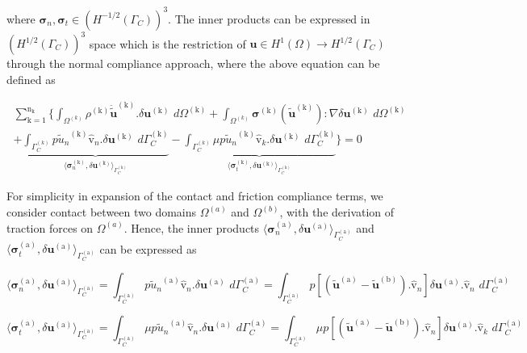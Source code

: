 where $\bm \sigma_n, \bm \sigma_t \in (H^{-1/2}(\Gamma_C))^3$.  The inner products can be expressed in $(H^{1/2}(\Gamma_C))^{3}$ space which is the restriction of $\bm u \in H^{1}(\Omega) \rightarrow H^{1/2} (\Gamma_C)$  through the normal compliance approach, where the above equation can be defined as  

\begin{multline}  
\sum_{\mathrm{k}=1}^{\mathrm{n}_{\mathrm{\mathrm{k}}}}   \bigg\{  \int_{\Omega^{(k)}}\rho^\mathrm{(k)}\bm{\ddot{\widetilde{u}}}^\mathrm{(k)}. \delta\bm u^\mathrm{(k)} \,\,d\Omega^\mathrm{(k)}+\int_{\Omega^{(k)}} \bm{\sigma}^\mathrm{(k)}(\bm{\widetilde u}^\mathrm{(k)}) : \nabla \delta\bm u^\mathrm{(k)} \,\,d\Omega^\mathrm{(k)}\\  
+ \underbrace{\int_{\Gamma^{(k)}_C}  \mathit{p}{\widetilde{u}_n}^{(\mathrm k)} \bm{\hat{\mathrm v}}_n. \delta\bm u^\mathrm{(k)}  \,\,d\Gamma_{C}^\mathrm{(k)}}_{\langle \bm{\sigma}^{\mathrm{(k)}}_n, \delta \bm u^{\mathrm{(k)}} \rangle_{\Gamma_C^{\mathrm{(k)}}}} 
- \underbrace{\int_{\Gamma^{(k)}_C} \mu \mathit{p}{\widetilde{u}_n}^{(\mathrm k)} \bm{\hat{\mathrm v}}_k. \delta\bm u^\mathrm{(k)}  \,\,d\Gamma_{C}^\mathrm{(k)}}_{\langle \bm{\sigma}^{\mathrm{(k)}}_t, \delta \bm u^{\mathrm{(k)}} \rangle_{\Gamma_C^{\mathrm{(k)}}}} \bigg\} = 0 
\end{multline}

For simplicity in expansion of the contact and friction compliance terms, we consider contact between two domains $\Omega^{(a)}$ and $\Omega^{(b)}$, with the derivation of traction forces on $\Omega^{(a)}$. Hence, the inner products ${\langle \bm{\sigma}^{\mathrm{(a)}}_n, \delta \bm u^{\mathrm{(a)}} \rangle_{\Gamma_C^{\mathrm{(a)}}}}$ and ${\langle \bm{\sigma}^{\mathrm{(a)}}_t, \delta \bm u^{\mathrm{(a)}} \rangle_{\Gamma_C^{\mathrm{(a)}}}}$ can be expressed as
 
\begin{equation}\label{pert_cont}
{\langle \bm{\sigma}^{\mathrm{(a)}}_n, \delta \bm u^{\mathrm{(a)}} \rangle_{\Gamma_C^{\mathrm{(a)}}}} = 
\int_{\Gamma^{(\mathrm a)}_C}  \mathit{p}{\widetilde{u}_n}^{(\mathrm a)} \bm{\hat{\mathrm v}}_n. \delta\bm u^\mathrm{(a)} \,\,d\Gamma_{C}^\mathrm{(a)}=
\int_{\Gamma^{(\mathrm a)}_C}  \mathit{p}[({\widetilde{\bm u}}^{(\mathrm a)} - {\widetilde{\bm u}}^{(\mathrm b)}). \bm{\hat{\mathrm v}}_n]  \delta\bm u^\mathrm{(a)}. \bm{\hat{\mathrm v}}_n \,\,d\Gamma_{C}^\mathrm{(a)}
\end{equation}

\begin{equation}\label{pert_fric}
{\langle \bm{\sigma}^{\mathrm{(a)}}_t, \delta \bm u^{\mathrm{(a)}} \rangle_{\Gamma_C^{\mathrm{(a)}}}} = 
\int_{\Gamma^{(\mathrm a)}_C}  \mu \mathit{p}{\widetilde{u}_n}^{(\mathrm a)} \bm{\hat{\mathrm v}}_n. \delta\bm u^\mathrm{(a)} \,\,d\Gamma_{C}^\mathrm{(a)}=
\int_{\Gamma^{(\mathrm a)}_C}  \mu \mathit{p}[({\widetilde{\bm u}}^{(\mathrm a)} - {\widetilde{\bm u}}^{(\mathrm b)}). \bm{\hat{\mathrm v}}_n] \delta\bm u^\mathrm{(a)}. \bm{\hat{\mathrm v}}_k \,\,d\Gamma_{C}^\mathrm{(a)}
\end{equation}

